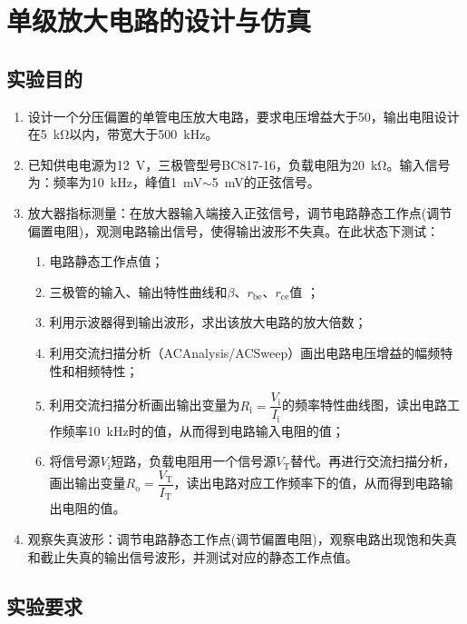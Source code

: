 \chapter{单级放大电路的设计与仿真}%
\label{cha:单级放大电路的设计与仿真}

\section{实验目的}%
\label{sec:\arabic{chapter}实验目的}

\begin{enumerate}
	\item 设计一个分压偏置的单管电压放大电路，要求电压增益大于50，输出电阻设计在\SI{5}{\kohm}以内，带宽大于\SI{500}{\kHz}。
	\item 已知供电电源为\SI{12}{\V}，三极管型号BC817-16，负载电阻为\SI{20}{\kohm}。输入信号为：频率为\SI{10}{\kHz}，峰值\SI{1}{\mV}$ \sim $\SI{5}{\mV}的正弦信号。
	\item 放大器指标测量：在放大器输入端接入正弦信号，调节电路静态工作点(调节偏置电阻)，观测电路输出信号，使得输出波形不失真。在此状态下测试：

		\begin{enumerate}
			\item 电路静态工作点值；
			\item 三极管的输入、输出特性曲线和$ \beta $、$ r_\mathrm{be} $、$ r_\mathrm{ce} $值 ；
			\item 利用示波器得到输出波形，求出该放大电路的放大倍数；
			\item 利用交流扫描分析（ACAnalysis/ACSweep）画出电路电压增益的幅频特性和相频特性；
			\item 利用交流扫描分析画出输出变量为$ R_\mathrm{i} = \dfrac{V_\mathrm{i}}{I_\mathrm{i}} $的频率特性曲线图，读出电路工作频率\SI{10}{\kHz}时的值，从而得到电路输入电阻的值；
			\item 将信号源$ V_\mathrm{i} $短路，负载电阻用一个信号源$ V_\mathrm{T} $替代。再进行交流扫描分析，画出输出变量$ R_\mathrm{o} = \dfrac{V_\mathrm{T}}{I_\mathrm{T}} $，读出电路对应工作频率下的值，从而得到电路输出电阻的值。
		\end{enumerate}

	\item 观察失真波形：调节电路静态工作点(调节偏置电阻)，观察电路出现饱和失真和截止失真的输出信号波形，并测试对应的静态工作点值。
\end{enumerate}

\section{实验要求}%
\label{sec:\arabic{chapter}实验要求}

